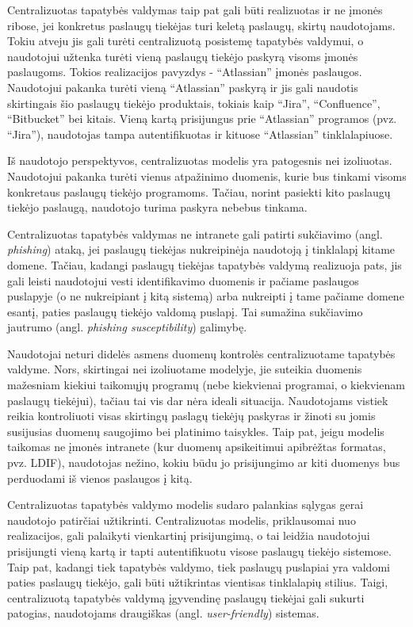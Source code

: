 Centralizuotas tapatybės valdymas taip pat gali būti realizuotas ir ne įmonės ribose, jei konkretus paslaugų tiekėjas
turi keletą paslaugų, skirtų naudotojams. Tokiu atveju jis gali turėti centralizuotą posistemę tapatybės valdymui, o naudotojui užtenka
turėti vieną paslaugų tiekėjo paskyrą visoms įmonės paslaugoms. Tokios realizacijos pavyzdys - \enquote{Atlassian} įmonės paslaugos. Naudotojui pakanka turėti vieną \enquote{Atlassian} paskyrą ir jis gali naudotis
skirtingais šio paslaugų tiekėjo produktais, tokiais kaip \enquote{Jira}, \enquote{Confluence}, \enquote{Bitbucket} bei kitais. Vieną kartą prisijungus prie \enquote{Atlassian} programos (pvz. \enquote{Jira}),
naudotojas tampa autentifikuotas ir kituose \enquote{Atlassian} tinklalapiuose. 

 
Iš naudotojo perspektyvos, centralizuotas modelis yra patogesnis nei izoliuotas. Naudotojui pakanka turėti vienus atpažinimo duomenis,
kurie bus tinkami visoms konkretaus paslaugų tiekėjo programoms. Tačiau, norint pasiekti kito paslaugų tiekėjo paslaugą,
naudotojo turima paskyra nebebus tinkama.

Centralizuotas tapatybės valdymas ne intranete gali patirti sukčiavimo (angl. \textit{phishing}) ataką, jei paslaugų tiekėjas nukreipinėja naudotoją į tinklalapį kitame domene. Tačiau,
kadangi paslaugų tiekėjas tapatybės valdymą realizuoja pats, jis gali leisti naudotojui vesti identifikavimo duomenis ir pačiame paslaugos puslapyje (o ne nukreipiant
į kitą sistemą) arba nukreipti į tame pačiame domene esantį, paties paslaugų tiekėjo valdomą puslapį. Tai sumažina sukčiavimo jautrumo (angl. \textit{phishing susceptibility}) galimybę.

Naudotojai neturi didelės asmens duomenų kontrolės centralizuotame tapatybės valdyme. Nors, skirtingai nei izoliuotame modelyje, jie suteikia duomenis mažesniam kiekiui taikomųjų programų
(nebe kiekvienai programai, o kiekvienam paslaugų tiekėjui), tačiau tai vis dar nėra ideali situacija. Naudotojams vistiek reikia kontroliuoti
visas skirtingų paslagų tiekėjų paskyras ir žinoti su jomis susijusias duomenų saugojimo bei platinimo taisykles. Taip pat, jeigu modelis taikomas ne įmonės intranete (kur
duomenų apsikeitimui apibrėžtas formatas, pvz. LDIF), naudotojas nežino, kokiu būdu jo prisijungimo ar kiti duomenys bus perduodami iš vienos paslaugos į kitą.

Centralizuotas tapatybės valdymo modelis sudaro palankias sąlygas gerai naudotojo patirčiai užtikrinti. Centralizuotas modelis, priklausomai nuo realizacijos,
gali palaikyti vienkartinį prisijungimą, o tai leidžia naudotojui prisijungti vieną kartą ir tapti autentifikuotu visose paslaugų tiekėjo sistemose. Taip pat, kadangi
tiek tapatybės valdymo, tiek paslaugų puslapiai yra valdomi paties paslaugų tiekėjo, gali būti užtikrintas vientisas tinklalapių stilius. Taigi, centralizuotą tapatybės valdymą
įgyvendinę paslaugų tiekėjai gali sukurti patogias, naudotojams draugiškas (angl. \textit{user-friendly}) sistemas.

